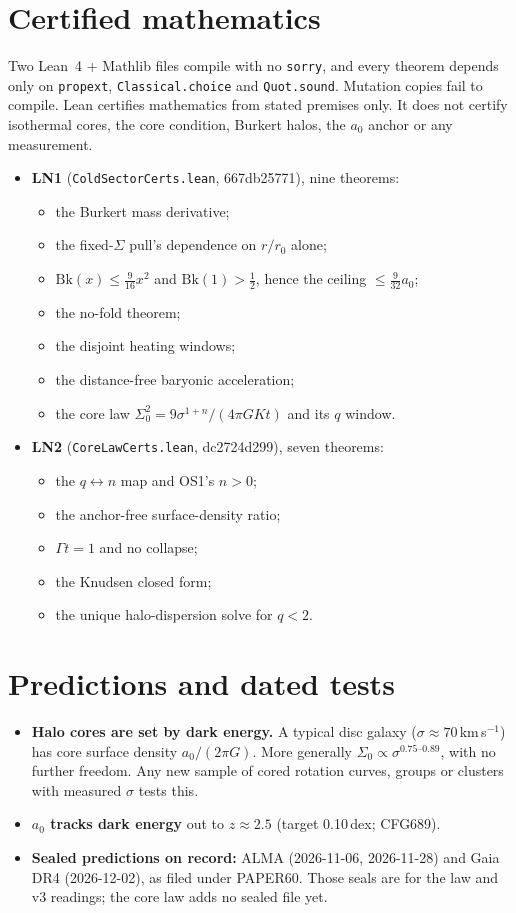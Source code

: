 \documentclass[10pt]{article}
\begin{document}
\section{Certified mathematics}\label{sec:lean}
Two Lean~4 + Mathlib files compile with no \texttt{sorry}, and every theorem depends only on \texttt{propext}, \texttt{Classical.choice} and \texttt{Quot.sound}. Mutation copies fail to compile. Lean certifies mathematics from stated premises only. It does not certify isothermal cores, the core condition, Burkert halos, the $a_0$ anchor or any measurement.
\begin{itemize}
\item \textbf{LN1} (\texttt{ColdSectorCerts.lean}, 667db25771), nine theorems:
\begin{itemize}
\item the Burkert mass derivative;
\item the fixed-$\Sigma$ pull's dependence on $r/r_0$ alone;
\item $\mathrm{Bk}(x)\le\tfrac{9}{16}x^2$ and $\mathrm{Bk}(1)>\tfrac12$, hence the ceiling $\le\tfrac{9}{32}a_0$;
\item the no-fold theorem;
\item the disjoint heating windows;
\item the distance-free baryonic acceleration;
\item the core law $\Sigma_0^2=9\sigma^{1+n}/(4\pi GKt)$ and its $q$ window.
\end{itemize}
\item \textbf{LN2} (\texttt{CoreLawCerts.lean}, dc2724d299), seven theorems:
\begin{itemize}
\item the $q\leftrightarrow n$ map and OS1's $n>0$;
\item the anchor-free surface-density ratio;
\item $\Gamma t=1$ and no collapse;
\item the Knudsen closed form;
\item the unique halo-dispersion solve for $q<2$.
\end{itemize}
\end{itemize}

\section{Predictions and dated tests}
\begin{itemize}
\item \textbf{Halo cores are set by dark energy.} A typical disc galaxy ($\sigma\approx70$\,km\,s$^{-1}$) has core surface density $a_0/(2\pi G)$. More generally $\Sigma_0\propto\sigma^{0.75\text{--}0.89}$, with no further freedom. Any new sample of cored rotation curves, groups or clusters with measured $\sigma$ tests this.
\item \textbf{$a_0$ tracks dark energy} out to $z\approx2.5$ (target 0.10\,dex; CFG689).
\item \textbf{Sealed predictions on record:} ALMA (2026-11-06, 2026-11-28) and Gaia DR4 (2026-12-02), as filed under PAPER60. Those seals are for the law and v3 readings; the core law adds no sealed file yet.
\end{itemize}
\end{document}
